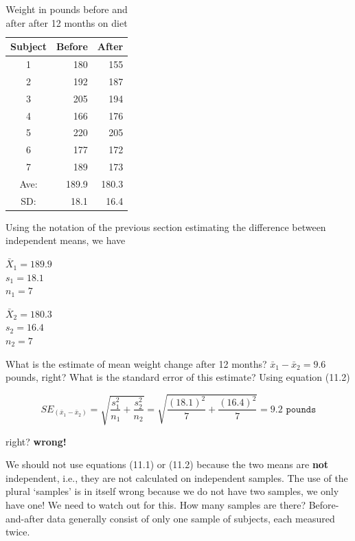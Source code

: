 \documentclass[11pt, chapterprefix=true]{scrbook}\usepackage[]{graphicx}\usepackage[]{color}
\begin{document}
\begin{table}[ht]
\centering
\caption{Weight in pounds before and after after 12 months on diet}
\begin{tabular}{@{} crr @{}} \hline
Subject & Before & After \\ \hline
1 & 180 & 155 \\
2 & 192 & 187 \\
3 & 205 & 194 \\
4 & 166 & 176 \\
5 & 220 & 205 \\
6 & 177 & 172 \\
7 & 189 & 173 \\ \hline
Ave: & 189.9 & 180.3 \\
SD:  & 18.1 & 16.4 \\ \hline
\end{tabular}
\end{table}

Using the notation of the previous section estimating the difference between independent means, we have

\begin{center}
\begin{minipage}[ht]{3cm}

$\bar{X}_1 = 189.9$ \\
$s_1 = 18.1$ \\
$n_1 = 7$ 
\end{minipage}
\begin{minipage}[ht]{3cm}

$\bar{X}_2 = 180.3$ \\
$s_2 = 16.4$ \\
$n_2 = 7$ 
\end{minipage}
\end{center}

What is the estimate of mean weight change after 12 months?  $\bar{x}_1 - \bar{x}_2 = 9.6$ pounds, right?  What is the standard error of this estimate? Using equation (11.2) 

\begin{equation*}
SE_{(\bar{x}_1 - \bar{x}_2)} = \sqrt{\frac{s_1^2}{n_1}  + \frac{s_2^2}{n_2} } = \sqrt{\frac{(18.1)^2}{7}  + \frac{(16.4)^2}{7} } = 9.2 \texttt{ pounds}
\end{equation*}

right?  \textbf{wrong!}

We should not use equations (11.1) or (11.2) because the two means are \textbf{not} independent, i.e., they are not calculated on independent samples. The use of the plural `samples' is in itself wrong because we do not have two samples, we only have one! We need to watch out for this.  How many samples are there?  Before-and-after data generally consist of only one sample of subjects, each measured twice.
\end{document}
